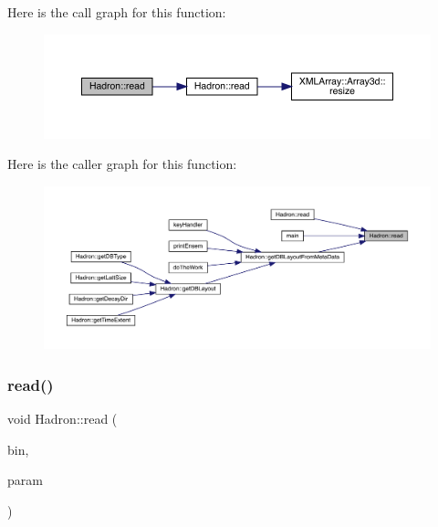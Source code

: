 Here is the call graph for this function\+:\nopagebreak
\begin{figure}[H]
\begin{center}
\leavevmode
\includegraphics[width=350pt]{d1/daf/namespaceHadron_a61520b9a5ce2b207d1c01e1508a5c470_cgraph}
\end{center}
\end{figure}
Here is the caller graph for this function\+:\nopagebreak
\begin{figure}[H]
\begin{center}
\leavevmode
\includegraphics[width=350pt]{d1/daf/namespaceHadron_a61520b9a5ce2b207d1c01e1508a5c470_icgraph}
\end{center}
\end{figure}
\mbox{\label{namespaceHadron_ac7fbe05fdb59de181eed9428364667e3}} 
\subsubsection{\texorpdfstring{read()}{read()}\hspace{0.1cm}{\footnotesize\ttfamily [24/94]}}
{\footnotesize\ttfamily void Hadron\+::read (\begin{DoxyParamCaption}\item[{\mbox{\hyperlink{classADATIO_1_1BinaryReader}{Binary\+Reader}} \&}]{bin,  }\item[{\mbox{\hyperlink{structHadron_1_1KeyPropElementalOperator__t}{Key\+Prop\+Elemental\+Operator\+\_\+t}} \&}]{param }\end{DoxyParamCaption})}



